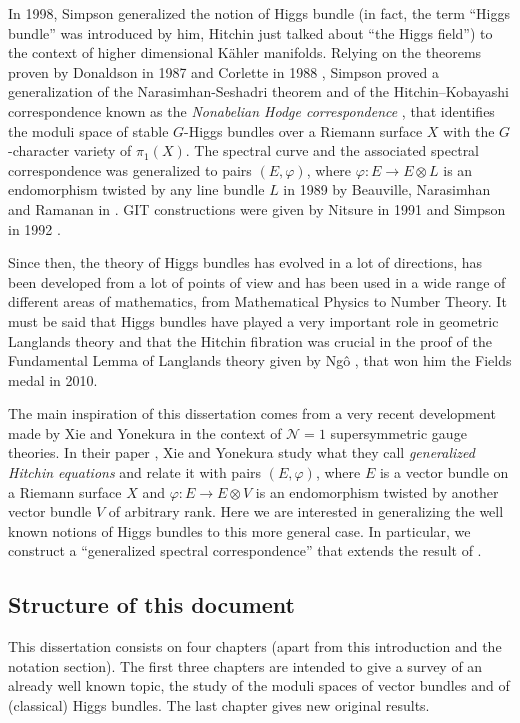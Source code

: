 \documentclass[12pt,a4paper]{book}
\theoremstyle{definition} \newtheorem{defn}[thm]{Definition}
\theoremstyle{definition} \newtheorem{ejemplo}[thm]{Example}
\theoremstyle{remark} \newtheorem{rem}[thm]{Remark}
\begin{document}
In 1998, Simpson \cite{simpsonthesis} generalized the notion of Higgs bundle (in fact, the term ``Higgs bundle'' was introduced by him, Hitchin just talked about ``the Higgs field'') to the context of higher dimensional Kähler manifolds. Relying on the theorems
proven by Donaldson in 1987 \cite{donaldsontwisted} and Corlette in 1988 \cite{corlette}, Simpson proved a generalization of the Narasimhan-Seshadri theorem and of the Hitchin--Kobayashi correspondence known as the \textit{Nonabelian Hodge correspondence} \cite{simpsonnonabelian}, that identifies the moduli space of stable $G$-Higgs bundles over a Riemann surface $X$ with the $G$-character variety of $\pi_1(X)$. 
The spectral curve and the associated spectral correspondence was generalized to pairs $(E,\varphi)$, where $\varphi:E\rightarrow E \otimes L$ is an endomorphism twisted by any line bundle $L$ in 1989 by Beauville, Narasimhan and Ramanan in \cite{bnr}. GIT constructions were given by Nitsure in 1991 \cite{nitsure} and Simpson in 1992 \cite{simpsonmoduli}.

Since then, the theory of Higgs bundles has evolved in a lot of directions, has been developed from a lot of points of view and has been used in a wide range of different areas of mathematics, from Mathematical Physics to Number Theory. It must be said that Higgs bundles have played a very important role in geometric Langlands theory and that the Hitchin fibration was crucial in the proof of the Fundamental Lemma of Langlands theory given by Ngô \cite{ngo}, that won him the Fields medal in 2010.

The main inspiration of this dissertation comes from a very recent development made by Xie and Yonekura in the context of $\mathcal{N}=1$ supersymmetric gauge theories. In their paper \cite{xieyonekura}, Xie and Yonekura study what they call \textit{generalized Hitchin equations} and relate it with pairs $(E,\varphi)$, where $E$ is a vector bundle on a Riemann surface $X$ and $\varphi:E\rightarrow E\otimes V$ is an endomorphism twisted by another vector bundle $V$ of arbitrary rank. Here we are interested in generalizing the well known notions of Higgs bundles to this more general case. In particular, we construct a ``generalized spectral correspondence'' that extends the result of \cite{bnr}.

\subsection*{Structure of this document}
This dissertation consists on four chapters (apart from this introduction and the notation section). The first three chapters are intended to give a survey of an already well known topic, the study of the moduli spaces of vector bundles and of (classical) Higgs bundles. The last chapter gives new original results.
\end{document}
